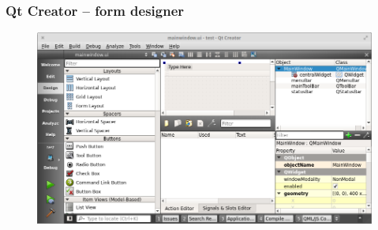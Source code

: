\begin{frame}
  \frametitle{Qt Creator -- form designer}
    \begin{figure}[!t]
    \centering
    \includegraphics[width=\textwidth]{images/qt_creator2.png}
    \end{figure}
\end{frame}

